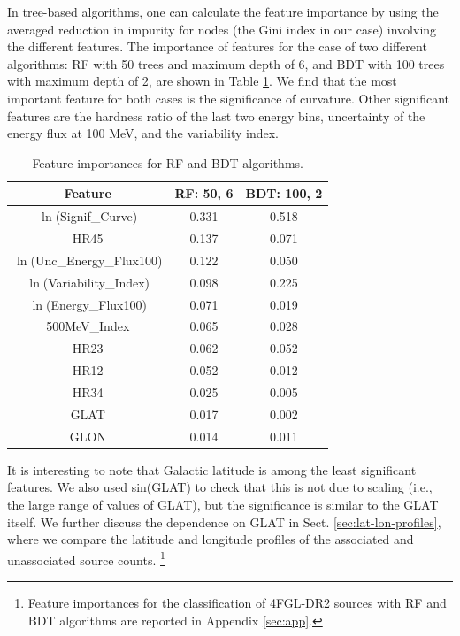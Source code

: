 \documentclass[referee]{aa} %
\begin{document}
In tree-based algorithms, one can calculate the feature importance by using the averaged reduction in impurity for nodes (the Gini index in our case) involving the different features. 
The importance of features for the case of two different algorithms: RF with 50 trees and maximum depth of 6, and BDT with 100 trees with maximum depth of 2,  are shown in Table \ref{tab:feat_imp}.
We find that the most important feature for both cases is the significance of curvature.
Other significant features are the hardness ratio of the last two energy bins, uncertainty of the energy flux at 100 MeV, and the variability index.


\begin{table}[!h]
\caption{Feature importances for RF and BDT algorithms.
}
\label{tab:feat_imp}
\tiny
\centering
\renewcommand{\tabcolsep}{1mm}
\renewcommand{\arraystretch}{1}

\begin{tabular}{c c c}
\hline
\hline
Feature & RF: 50, 6 & BDT: 100, 2\\
\hline
{ $\ln$(Signif\_Curve)}&  0.331  & 0.518   \\
{ HR45}&0.137&0.071\\
{ $\ln$(Unc\_Energy\_Flux100)} &0.122& 0.050   \\
$\ln$(Variability\_Index)& 0.098&0.225  \\
$\ln$(Energy\_Flux100) & 0.071&0.019   \\
500MeV\_Index&0.065& 0.028  \\
HR23 & 0.062&0.052  \\
HR12& 0.052&0.012  \\
HR34&0.025&0.005\\
GLAT &0.017& 0.002     \\
GLON & 0.014&0.011  \\
\hline
\end{tabular}
\end{table}

It is interesting to note that Galactic latitude is among the least significant features.
We also used sin(GLAT) to check that this is not due to scaling (i.e., the large range of values of GLAT),
but the significance is similar to the GLAT itself.
We further discuss the dependence on GLAT in Sect. \ref{sec:lat-lon-profiles}, 
where we compare the latitude and longitude profiles of the associated and unassociated source counts.%
\footnote{Feature importances for the classification of 4FGL-DR2 sources with RF and BDT algorithms are reported in Appendix \ref{sec:app}.}
\end{document}
